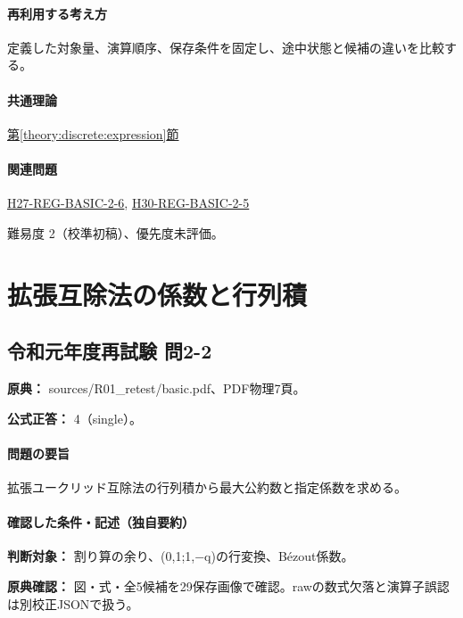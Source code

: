 \paragraph{再利用する考え方} 定義した対象量、演算順序、保存条件を固定し、途中状態と候補の違いを比較する。

\paragraph{共通理論} \hyperref[theory:discrete:expression]{第\ref*{theory:discrete:expression}節}

\paragraph{関連問題} \hyperref[q:h27-reg-basic-2-6]{H27-REG-BASIC-2-6}, \hyperref[q:h30-reg-basic-2-5]{H30-REG-BASIC-2-5}

\par 難易度 2（校準初稿）、優先度未評価。

\section{拡張互除法の係数と行列積}

\subsection{令和元年度再試験 問2-2}
\label{q:r01-ret-basic-2-2}

\noindent\textbf{原典：} sources/R01\_retest/basic.pdf、PDF物理7頁。

\textbf{公式正答：} 4（single）。

\paragraph{問題の要旨} 拡張ユークリッド互除法の行列積から最大公約数と指定係数を求める。

\paragraph{確認した条件・記述（独自要約）}\mbox{}\par

\noindent\textbf{判断対象：} 割り算の余り、(0,1;1,−q)の行変換、Bézout係数。\par

\noindent\textbf{原典確認：} 図・式・全5候補を29保存画像で確認。rawの数式欠落と演算子誤認は別校正JSONで扱う。\par


